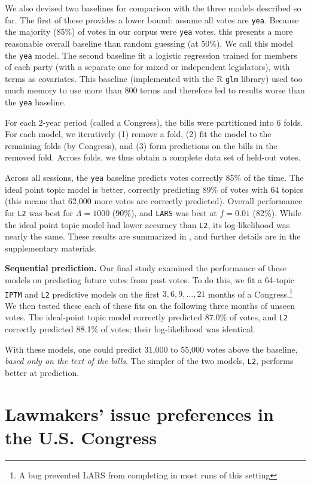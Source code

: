 We also devised two baselines for comparison with the three models
described so far.  The first of these provides a lower bound: assume
all votes are \verb!yea!.  Because the majority (85\%) of votes in our
corpus were \verb!yea! votes, this presents a more reasonable overall
baseline than random guessing (at 50\%).  We call this model the
\verb!yea!  model.  The second baseline fit a logistic regression
trained for members of each party (with a separate one for mixed or
independent legislators), with terms as covariates.  This baseline
(implemented with the R \verb!glm! library) used too much memory to
use more than 800 terms and therefore led to results worse than the
\verb!yea!  baseline.

For each 2-year period (called a Congress), the bills were partitioned
into 6 folds.  For each model, we iteratively (1) remove a fold, (2)
fit the model to the remaining folds (by Congress), and (3) form
predictions on the bills in the removed fold.  Across folds, we thus
obtain a complete data set of held-out votes.

Across all sessions, the \verb!yea! baseline predicts votes correctly
85\% of the time.  The ideal point topic model is better, correctly
predicting 89\% of votes with 64 topics (this means that 62,000 more
votes are correctly predicted).  Overall performance for \verb!L2! was
best for $\Lambda=1000$ (90\%), and \verb!LARS! was best at $f=0.01$
(82\%).  While the ideal point topic model had lower accuracy than
\verb!L2!, its log-likelihood was nearly the same.  These results are
summarized in , and further details are in the
supplementary materials.

\textbf{Sequential prediction.}  Our final study examined the
performance of these models on predicting future votes from past
votes.  To do this, we fit a 64-topic \verb!IPTM! and \verb!L2!
predictive models on the first $3, 6, 9, \ldots, 21$ months of a
Congress.\footnote{A bug prevented LARS from completing in most runs of
this setting}  We then tested these each of these fits on the
following three months of unseen votes.  The ideal-point topic model
correctly predicted $87.0\%$ of votes, and \verb!L2!  correctly
predicted 88.1\% of votes; their log-likelihood was identical.

With these models, one could predict 31,000 to 55,000 votes
above the baseline, \emph{based only on the text of the bills}.  The
simpler of the two models, \verb!L2!, performs better at prediction.

\section{Lawmakers' issue preferences in the U.S. Congress}

